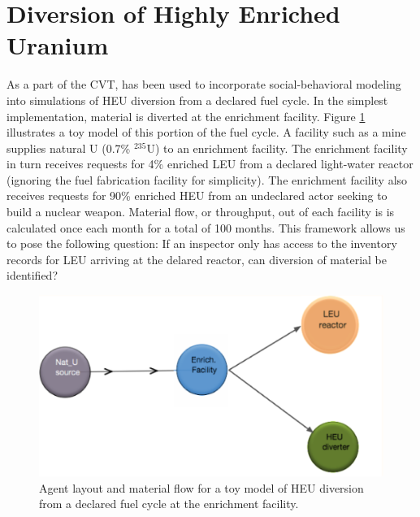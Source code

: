 \section{Diversion of Highly Enriched Uranium}
\label{s_results}
As a part of the \gls{CVT}, \Cyclus has been used to incorporate social-behavioral modeling into simulations of \gls{HEU} diversion from a declared fuel cycle.  In the simplest implementation, material is diverted at the enrichment facility.  Figure \ref{fig:heu_layout} illustrates a toy model of this portion of the fuel cycle. A facility such as a mine supplies natural \gls{U} (0.7\% $^{235}$U) to an enrichment facility.  The enrichment facility in turn receives requests for 4\% enriched \gls{LEU} from a declared light-water reactor (ignoring the fuel fabrication facility for simplicity).  The enrichment facility also receives requests for 90\% enriched \gls{HEU} from an undeclared actor seeking to build a nuclear weapon. Material flow, or throughput, out of each facility is is calculated once each month for a total of 100 months.  This framework allows us to pose the following question: If an inspector only has access to the inventory records for LEU arriving at the delared reactor, can diversion of material be identified?

\begin{figure}%
\begin{center}
\includegraphics[natwidth=162bp,natheight=227bp, scale=0.7]{./figs/heu_cyclist_layout.png}
\end{center}
\caption{Agent layout and material flow for a toy model of \gls{HEU} diversion from a declared fuel cycle at the enrichment facility.}
\label{fig:heu_layout}
\end{figure}

